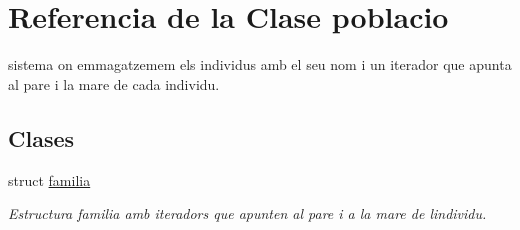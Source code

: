 \hypertarget{classpoblacio}{}\section{Referencia de la Clase poblacio}
\label{classpoblacio}


sistema on emmagatzemem els individus amb el seu nom i un iterador que apunta al pare i la mare de cada individu.  


\subsection*{Clases}
\begin{DoxyCompactItemize}
\item 
struct \hyperlink{structpoblacio_1_1familia}{familia}
\begin{DoxyCompactList}\small\item\em Estructura familia amb iteradors que apunten al pare i a la mare de l\textquotesingle{}individu. \end{DoxyCompactList}\end{DoxyCompactItemize}
